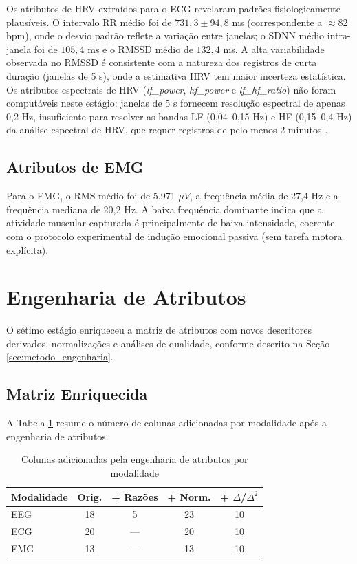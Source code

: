 Os atributos de HRV extraídos para o ECG revelaram padrões fisiologicamente plausíveis. O intervalo RR médio foi de $731{,}3 \pm 94{,}8$ ms (correspondente a $\approx 82$ bpm), onde o desvio padrão reflete a variação entre janelas; o SDNN médio intra-janela foi de $105{,}4$ ms e o RMSSD médio de $132{,}4$ ms. A alta variabilidade observada no RMSSD é consistente com a natureza dos registros de curta duração (janelas de 5 s), onde a estimativa HRV tem maior incerteza estatística. Os atributos espectrais de HRV (\textit{lf\_power}, \textit{hf\_power} e \textit{lf\_hf\_ratio}) não foram computáveis neste estágio: janelas de 5 s fornecem resolução espectral de apenas 0{,}2 Hz, insuficiente para resolver as bandas LF (0{,}04--0{,}15 Hz) e HF (0{,}15--0{,}4 Hz) da análise espectral de HRV, que requer registros de pelo menos 2 minutos \cite{taskforce1996}.

\subsection{Atributos de EMG}

Para o EMG, o RMS médio foi de 5.971 $\mu V$, a frequência média de 27{,}4 Hz e a frequência mediana de 20{,}2 Hz. A baixa frequência dominante indica que a atividade muscular capturada é principalmente de baixa intensidade, coerente com o protocolo experimental de indução emocional passiva (sem tarefa motora explícita).

\section{Engenharia de Atributos}
\label{sec:resultados_engenharia}

O sétimo estágio enriqueceu a matriz de atributos com novos descritores derivados, normalizações e análises de qualidade, conforme descrito na Seção \ref{sec:metodo_engenharia}.

\subsection{Matriz Enriquecida}

A Tabela \ref{tab:eng_summary} resume o número de colunas adicionadas por modalidade após a engenharia de atributos.

\begin{table}[htbp]
    \centering
    \caption{Colunas adicionadas pela engenharia de atributos por modalidade}
    \label{tab:eng_summary}
    \begin{tabular}{lcccc}
        \toprule
        \textbf{Modalidade} & \textbf{Orig.} & \textbf{+ Razões} & \textbf{+ Norm.} & \textbf{+ $\Delta$/$\Delta^2$} \\
        \midrule
        EEG & 18 & 5 & 23 & 10 \\
        ECG & 20 & — & 20 & 10 \\
        EMG & 13 & — & 13 & 10 \\
        \bottomrule
    \end{tabular}
\end{table}

